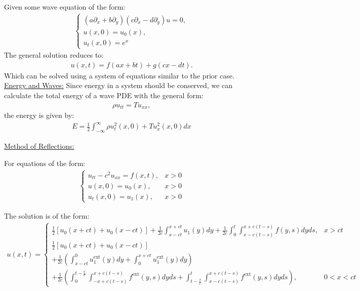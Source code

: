 \documentclass{article}
\newcommand{\sheader}[1]{\underline{#1:}}
\newcommand{\gap}{\medskip\\}
\begin{document}
Given some wave equation of the form:
\begin{align*}
    \begin{cases}
        (a\partial_x + b\partial_y)(c\partial_x - d\partial_y) u = 0,\\
        u(x, 0) = u_0(x),\\
        u_t(x, 0) = e^x
    \end{cases}
\end{align*}
The general solution reduces to:
\begin{align*}
    u(x, t) = f(ax + bt) + g(cx - dt).
\end{align*}
Which can be solved using a system of equations similar to the prior case.
\gap
\sheader{Energy and Waves}
Since energy in a system should be conserved, we can calculate the total 
energy of a wave PDE with the general form:
\begin{align*}
    \rho u_{tt} = Tu_{xx},
\end{align*}
the energy is given by:
\begin{align*}
    E = \frac{1}{2} \int_{-\infty}^{\infty} \rho u_t^2(x, 0) + Tu_x^2(x, 0) dx
\end{align*}

\sheader{Method of Reflections}

For equations of the form:
\begin{align*}
    \begin{cases}
        u_{tt} - c^2 u_{xx} = f(x, t), & x > 0\\
        u(x, 0) = u_0(x), & x > 0\\
        u_t(x, 0) = u_1(x), & x > 0
    \end{cases}
\end{align*}

The solution is of the form:
\begin{align*} u(x, t) = 
    \begin{cases}
        \frac{1}{2}\left[u_0(x +ct) + u_0(x-ct)\right] + \frac{1}{2c}\int_{x-ct}^{x+ct}u_1(y)dy
        + \frac{1}{2c}\int_{0}^{t}\int_{x-c(t-s)}^{x+c(t-s)} f(y, s)dyds, & x > ct\\
        \frac{1}{2}\left[u_0(x +ct) + u_0(x-ct)\right] \\ + \frac{1}{2c}\left(\int_{x-ct}^{0}u_1^{\textrm{ext}}(y)dy + \int_{0}^{x+ct}u_1^{\textrm{ext}}(y)dy\right)
        \\+ \frac{1}{2c}\left(\int_{0}^{t - \frac{x}{c}}\int_{-x+c(t-s)}^{x+c(t-s)} f^{\textrm{ext}}(y, s)dyds + \int_{t-\frac{x}{c}}^{t}\int_{x-c(t-s)}^{x+c(t-s)} f^{\textrm{ext}}(y, s)dyds \right), & 0 < x < ct
    \end{cases}
\end{align*}
\end{document}
